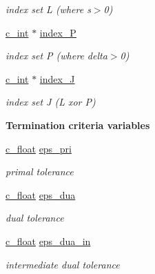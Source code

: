 \begin{Indent}
\begin{DoxyCompactItemize}
\begin{DoxyCompactList}\small\item\em index set L (where s$>$0) \end{DoxyCompactList}\item 
\mbox{\hyperlink{global__opts_8h_aa3217a0f49d3e52b74e9dd830c44472f}{c\+\_\+int}} $\ast$ \mbox{\hyperlink{structQPALMWorkspace_a45ccfcbf6d91b05ecac8df1b31dee2b9}{index\+\_\+P}}
\begin{DoxyCompactList}\small\item\em index set P (where delta$>$0) \end{DoxyCompactList}\item 
\mbox{\hyperlink{global__opts_8h_aa3217a0f49d3e52b74e9dd830c44472f}{c\+\_\+int}} $\ast$ \mbox{\hyperlink{structQPALMWorkspace_a43b0fc9c50417ee9ed33acece1f61563}{index\+\_\+J}}
\begin{DoxyCompactList}\small\item\em index set J (L xor P) \end{DoxyCompactList}\end{DoxyCompactItemize}
\end{Indent}
\begin{Indent}\textbf{ Termination criteria variables}\par
\begin{DoxyCompactItemize}
\item 
\mbox{\hyperlink{global__opts_8h_a7f1a9fda95e52979658c20a0d134fb15}{c\+\_\+float}} \mbox{\hyperlink{structQPALMWorkspace_a2df42d22fd641d59753042919ab32a64}{eps\+\_\+pri}}
\begin{DoxyCompactList}\small\item\em primal tolerance \end{DoxyCompactList}\item 
\mbox{\hyperlink{global__opts_8h_a7f1a9fda95e52979658c20a0d134fb15}{c\+\_\+float}} \mbox{\hyperlink{structQPALMWorkspace_a66248f1ef4c0895a8a21afefacfd92f1}{eps\+\_\+dua}}
\begin{DoxyCompactList}\small\item\em dual tolerance \end{DoxyCompactList}\item 
\mbox{\hyperlink{global__opts_8h_a7f1a9fda95e52979658c20a0d134fb15}{c\+\_\+float}} \mbox{\hyperlink{structQPALMWorkspace_ab524d1db9548476f2bd2ab17968cbbc4}{eps\+\_\+dua\+\_\+in}}
\begin{DoxyCompactList}\small\item\em intermediate dual tolerance \end{DoxyCompactList}\end{DoxyCompactItemize}
\end{Indent}
